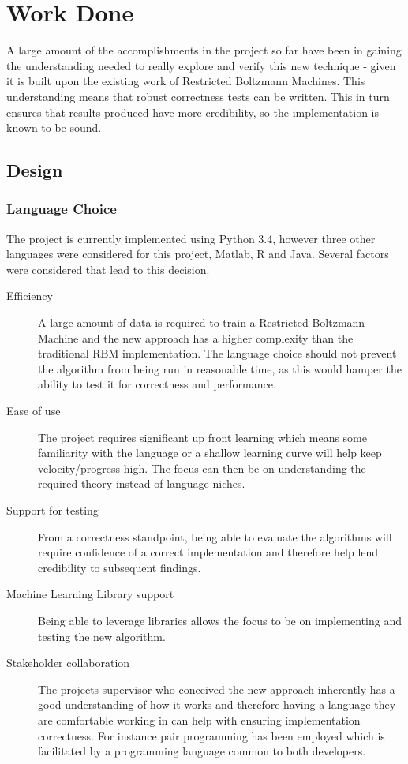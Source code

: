 \chapter{Work Done}\label{C:work}

A large amount of the accomplishments in the project so far have been in gaining the understanding needed to really explore and verify this new technique - given it is built upon the existing work of Restricted Boltzmann Machines. This understanding means that robust correctness tests can be written. This in turn ensures that results produced have more credibility, so the implementation is known to be sound. 

\section{Design}\label{S:design}

\subsection{Language Choice}\label{SS:language}

The project is currently implemented using Python 3.4, however three other languages were considered for this project, Matlab, R and Java.
Several factors were considered that lead to this decision. 

\begin{description}
\item[Efficiency]A large amount of data is required to train a Restricted Boltzmann Machine and the new approach has a higher complexity than the traditional RBM implementation. The language choice should not prevent the algorithm from being run in reasonable time, as this would hamper the ability to test it for correctness and performance. 
\item [Ease of use]The project requires significant up front learning which means some familiarity with the language or a shallow learning curve will help keep velocity/progress high. The focus can then be on understanding the required theory instead of language niches. 
\item  [Support for testing]From a correctness standpoint, being able to evaluate the algorithms will require confidence of a correct implementation and therefore help lend credibility to subsequent findings. 
\item [Machine Learning Library support]Being able to leverage libraries allows the focus to be on implementing and testing the new algorithm.
\item [Stakeholder collaboration]The projects supervisor who conceived the new approach inherently has a good understanding of how it works and therefore having a language they are comfortable working in can help with ensuring implementation correctness. For instance pair programming has been employed which is facilitated by a programming language common to both developers.
\end{description}

